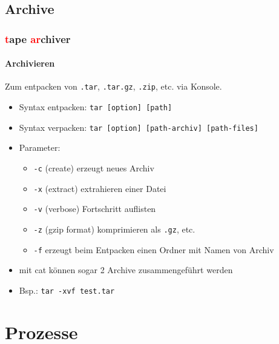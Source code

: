 \documentclass[12pt,utf8, handout]{beamer}
\begin{document}
\subsection{Archive}
\begin{frame}
\frametitle{\textcolor{red}{t}ape \textcolor{red}{ar}chiver}
\framesubtitle{\textcolor{ownDarkOr}{Archivieren}}
Zum entpacken von \texttt{.tar}, \texttt{.tar.gz}, \texttt{.zip}, etc. via Konsole.
\begin{itemize}[<+->]
	\item Syntax entpacken: \texttt{tar [option] [path]}
	\item Syntax verpacken: \texttt{tar [option] [path-archiv] [path-files]}
	\item Parameter:
	\begin{itemize}[<+->]
		\item {\scriptsize \texttt{-c} (create) erzeugt neues Archiv}
		\item {\scriptsize \texttt{-x} (extract) extrahieren einer Datei}
		\item {\scriptsize \texttt{-v} (verbose) Fortschritt auflisten}
		\item {\scriptsize \texttt{-z} (gzip format) komprimieren als \texttt{.gz}, etc.}
		\item {\scriptsize \texttt{-f} erzeugt beim Entpacken einen Ordner mit Namen von Archiv}
	\end{itemize}
	\item {\scriptsize mit cat können sogar 2 Archive zusammengeführt werden}
	\item Bsp.: \texttt{tar -xvf test.tar}
\end{itemize}
\end{frame}

\section{Prozesse}
\end{document}
